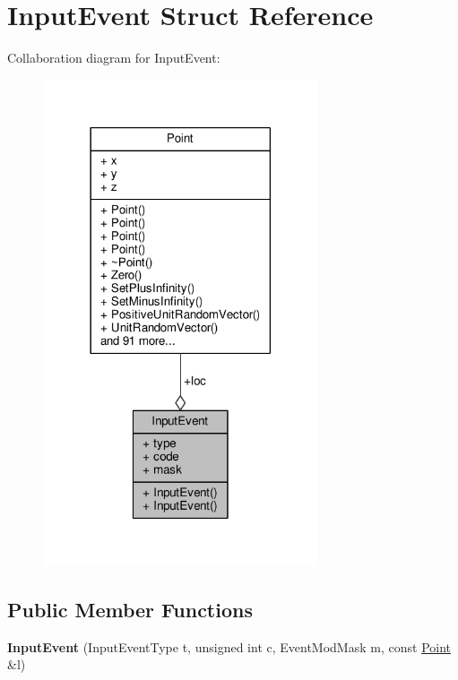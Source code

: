 \hypertarget{structInputEvent}{}\section{Input\+Event Struct Reference}
\label{structInputEvent}


Collaboration diagram for Input\+Event\+:
\nopagebreak
\begin{figure}[H]
\begin{center}
\leavevmode
\includegraphics[width=230pt]{d6/dc1/structInputEvent__coll__graph}
\end{center}
\end{figure}
\subsection*{Public Member Functions}
\begin{DoxyCompactItemize}
\item 
{\bfseries Input\+Event} (Input\+Event\+Type t, unsigned int c, Event\+Mod\+Mask m, const \hyperlink{classPoint}{Point} \&l)\hypertarget{structInputEvent_addba9086d4ff9f983e282bbdc0cbe8d9}{}\label{structInputEvent_addba9086d4ff9f983e282bbdc0cbe8d9}

\end{DoxyCompactItemize}
